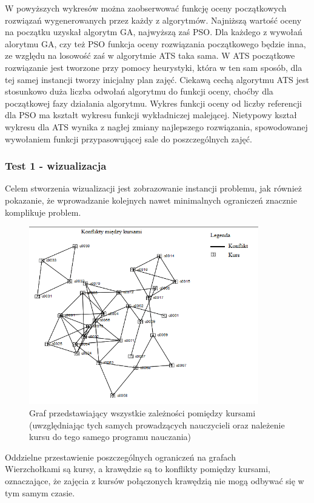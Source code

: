 W powyższych wykresów można zaobserwować funkcję oceny początkowych rozwiązań wygenerowanych przez każdy z algorytmów. Najniższą wartość oceny na początku uzyskał algorytm GA, najwyższą zaś PSO. Dla każdego z wywołań alorytmu GA, czy też PSO funkcja oceny rozwiązania początkowego będzie inna, ze względu na losowość zaś w algorytmie ATS taka sama. W ATS początkowe rozwiązanie jest tworzone przy pomocy heurystyki, która w ten sam sposób, dla tej samej instancji tworzy inicjalny plan zajęć. Ciekawą cechą algorytmu ATS jest stosunkowo duża liczba odwołań algorytmu do funkcji oceny, choćby dla początkowej fazy działania algorytmu. Wykres funkcji oceny od liczby referencji dla PSO ma kształt wykresu funkcji wykładniczej malejącej. Nietypowy kształ wykresu dla ATS wynika z nagłej zmiany najlepszego rozwiązania, spowodowanej wywołaniem funkcji przypasowującej sale do poszczególnych zajęć. 
\subsubsection{Test 1 - wizualizacja}
Celem stworzenia wizualizacji jest zobrazowanie instancji problemu, jak również pokazanie, że wprowadzanie kolejnych nawet minimalnych ograniczeń znacznie komplikuje problem.
\begin{figure}[H]
  \caption{Graf przedstawiający wszystkie zależności pomiędzy kursami (uwzględniając tych samych prowadzących nauczycieli oraz należenie kursu do tego samego programu nauczania) }
  \centering
    \includegraphics[width=10cm]{test1.PNG}
\end{figure}
\par Oddzielne przestawienie poszczególnych ograniczeń na grafach\\ Wierzchołkami są kursy, a krawędzie są to konflikty pomiędzy kursami, oznaczające, że zajęcia z kursów połączonych krawędzią nie mogą odbywać się w tym samym czasie.

